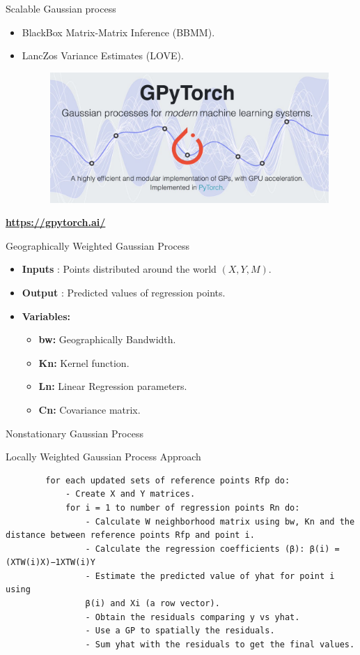 \documentclass{beamer}
\newcommand{\hrefcol}[2]{\textcolor{cyan}{\href{#1}{#2}}}
\begin{document}
\begin{frame}{Scalable Gaussian process}
	\begin{itemize}
		\item BlackBox Matrix-Matrix Inference (BBMM).				
		\item LancZos Variance Estimates (LOVE).
		\bigskip	
		\begin{figure}
			\centering
			\includegraphics[width=0.6\linewidth]{images/figure_14}
			\label{fig:figure11}
		\end{figure}
	\end{itemize}
	\centering
	\textbf{\hrefcol{https://gpytorch.ai/}{https://gpytorch.ai/}}
\end{frame}



\begin{frame}{Geographically Weighted Gaussian Process}	
\begin{itemize}
	\item \textbf{Inputs} : Points distributed around the world $(X, Y, M)$.
	\item \textbf{Output} : Predicted values of regression points.
	\item \textbf{Variables:} 
	\begin{itemize}
		\item \textbf{bw:} Geographically Bandwidth.
		\item \textbf{Kn:} Kernel function.
		\item \textbf{Ln:} Linear Regression parameters.
		\item \textbf{Cn:} Covariance matrix.
	\end{itemize}
\end{itemize}
\end{frame}

\begin{frame}[fragile]{Nonstationary Gaussian Process}
\begin{block}{Locally Weighted Gaussian Process Approach}
	\begin{verbatim}
		for each updated sets of reference points Rfp do:
			- Create X and Y matrices.
			for i = 1 to number of regression points Rn do:				
				- Calculate W neighborhood matrix using bw, Kn and the distance between reference points Rfp and point i.
				- Calculate the regression coefficients (β): β(i) = (XTW(i)X)−1XTW(i)Y
				- Estimate the predicted value of yhat for point i using
				β(i) and Xi (a row vector).
				- Obtain the residuals comparing y vs yhat.
				- Use a GP to spatially the residuals.
				- Sum yhat with the residuals to get the final values.							
	\end{verbatim}
\end{block}
\end{frame}
\end{document}
